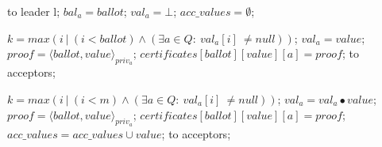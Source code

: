 \begin{algorithm}
\begin{algorithmic}[1]
		\State
		\State {} to leader l;
		\State $bal_a = ballot$;	
		\State $val_a = \bot$;	
		\State $acc\_values = \emptyset$;		
		\EndIf
		\EndFunction
	
		\State
		\State $k = max(i\ |\ (i < ballot) \wedge (\exists a \in Q :\ val_a[i]\ \neq null))$;
		\State $val_a = value$;
		\State $proof = \langle ballot, value \rangle_{priv_a}$;
		\State $certificates[ballot][value][a] = proof$;
		\State {} to acceptors;
		\EndIf
		\EndFunction
		
		\State
		\State $k = max(i\ |\ (i < m) \wedge (\exists a \in Q :\ val_a[i]\ \neq null))$;
		\State $val_a =  val_a \bullet value$;
		\State $proof = \langle ballot, value \rangle_{priv_a}$;
		\State $certificates[ballot][value][a] = proof$;
		\State $acc\_values = acc\_values \cup  value$;
		\State {} to acceptors;
		\EndIf
		\EndFunction
	\end{algorithmic}
\end{algorithm}

